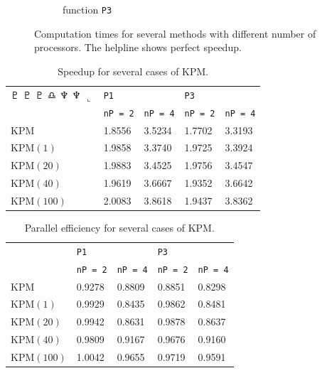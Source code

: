 \begin{figure}[H]
\begin{subfigure}[b]{0.45\textwidth}
                \caption{function \texttt{P3}}
                \label{fig:speed2}
        \end{subfigure}
        \caption{Computation times for several methods with different number of processors. The helpline shows perfect speedup.}\label{fig:speed}

\end{figure}

\begin{table}[H]
\centering
\begin{tabular}{l | l l | l l}
$\Pluto$
$\pluto$ $\Pluto$
$\libra$
$\neptune$ $\Neptune$
$\llcorner$
 &\texttt{P1} & & \texttt{P3} & \\
&\texttt{nP = 2} & \texttt{nP = 4} & \texttt{nP = 2} & \texttt{nP = 4} \\
\hline
KPM & 1.8556  &  3.5234 & 1.7702&    3.3193\\
KPM$(1)$ & 1.9858  &  3.3740 & 1.9725&    3.3924\\
KPM$(20)$ & 1.9883  &  3.4525 & 1.9756&    3.4547\\
KPM$(40)$ & 1.9619  &  3.6667 & 1.9352&   3.6642\\
KPM$(100)$ & 2.0083  &  3.8618 & 1.9437&    3.8362\\
\end{tabular}
\caption{Speedup for several cases of KPM.}
\label{tab:speedup}
\end{table}

\begin{table}[H]
\centering
\begin{tabular}{l | l l | l l}
&\texttt{P1} & & \texttt{P3} & \\
&\texttt{nP = 2} & \texttt{nP = 4} & \texttt{nP = 2} & \texttt{nP = 4} \\
\hline
KPM & 0.9278  &  0.8809 & 0.8851&    0.8298\\
KPM$(1)$ &  0.9929  &  0.8435 & 0.9862 &   0.8481\\
KPM$(20)$ & 0.9942  &  0.8631 & 0.9878&    0.8637\\
KPM$(40)$ & 0.9809  &  0.9167 & 0.9676&    0.9160\\
KPM$(100)$ & 1.0042  &  0.9655 & 0.9719&    0.9591\\
\end{tabular}
\caption{Parallel efficiency for several cases of KPM. }
\label{tab:eff}
\end{table}

